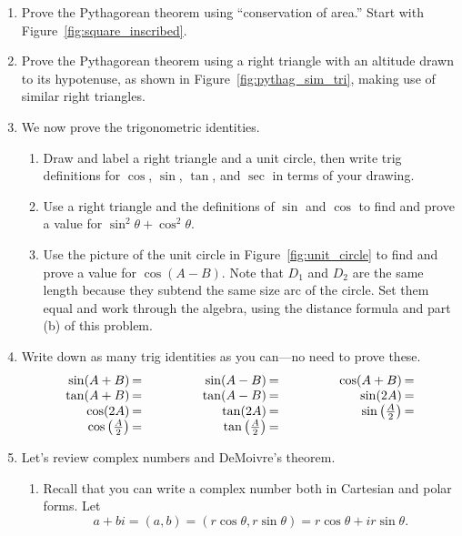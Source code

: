 \documentclass[../gatm.tex]{subfiles}
\begin{document}
\begin{enumerate}
\item Prove the Pythagorean theorem using ``conservation of area.'' Start with Figure~\ref{fig:square_inscribed}.
\item Prove the Pythagorean theorem using a right triangle with an altitude drawn to its hypotenuse, as shown in Figure~\ref{fig:pythag_sim_tri}, making use of similar right triangles.
\item We now prove the trigonometric identities.
\begin{enumerate}
\item Draw and label a right triangle and a unit circle, then write trig definitions for $\cos$, $\sin$, $\tan$, and $\sec$ in terms of your drawing.
\item Use a right triangle and the definitions of $\sin$ and $\cos$ to find and prove a value for $\sin^2 \theta + \cos^2 \theta$.
\item Use the picture of the unit circle in Figure~\ref{fig:unit_circle} to find and prove a value for $\cos(A-B)$. Note that $D_1$ and $D_2$ are the same length because they subtend the same size arc of the circle. Set them equal and work through the algebra, using the distance formula and part (b) of this problem.
\end{enumerate}
\item Write down as many trig identities as you can---no need to prove these.
\renewcommand{\arraystretch}{1.1}
$$\arraycolsep=1pt\begin{array}{rlrlrl}
\sin(A+B)&=\qquad\qquad\phantom{.}&\sin(A-B) &=\qquad\qquad\phantom{.}&\cos(A+B) &= \\
\tan(A+B)&= &\tan(A-B) &= &\sin(2A) &= \\
\cos(2A)&= &\tan(2A) &= &\sin\left(\frac{A}{2}\right) &= \\
\cos\left(\frac{A}{2}\right)&= &\tan\left(\frac{A}{2}\right) &= & & \\
\end{array}$$

\item Let's review complex numbers and DeMoivre's theorem.
\begin{enumerate}
\item Recall that you can write a complex number both in Cartesian and polar forms. Let
\[a+bi=(a,b)=(r\cos\theta,r\sin\theta)=r\cos\theta+ir\sin\theta.\]


\end{enumerate}
\end{enumerate}
\end{document}
